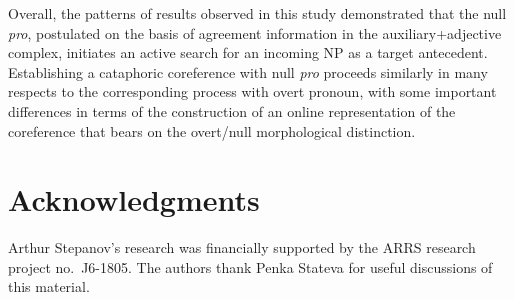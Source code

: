 \documentclass[output=paper,colorlinks,citecolor=brown]{langscibook}
\begin{document}
Overall, the patterns of results observed in this study demonstrated that the null \textit{pro}, postulated on the basis of agreement information in the auxiliary+ad\-jec\-tive complex, initiates an active search for an incoming NP as a target antecedent. Establishing a cataphoric coreference with null \textit{pro} proceeds similarly in many respects to the corresponding process with overt pronoun, with some important differences in terms of the construction of an online representation of the coreference that bears on the overt\slash null morphological distinction.

\section*{Acknowledgments}
\begin{sloppypar}
Arthur Stepanov’s research was financially supported by the ARRS research project no.~J6-1805. The authors thank Penka Stateva for useful discussions of this material.
\end{sloppypar}


\printbibliography[heading=subbibliography,notkeyword=this]
\end{document}
